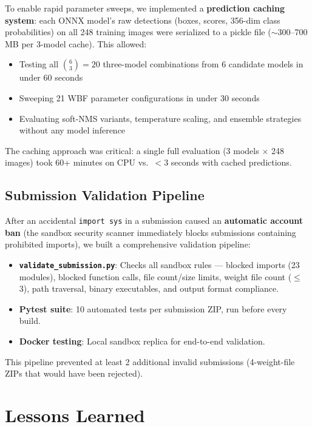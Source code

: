 \documentclass[11pt,a4paper]{article}
\begin{document}
To enable rapid parameter sweeps, we implemented a \textbf{prediction caching system}: each ONNX model's raw detections (boxes, scores, 356-dim class probabilities) on all 248 training images were serialized to a pickle file ($\sim$300--700\,MB per 3-model cache). This allowed:

\begin{itemize}
\item Testing all $\binom{6}{3} = 20$ three-model combinations from 6 candidate models in under 60 seconds
\item Sweeping 21 WBF parameter configurations in under 30 seconds
\item Evaluating soft-NMS variants, temperature scaling, and ensemble strategies without any model inference
\end{itemize}

The caching approach was critical: a single full evaluation (3 models $\times$ 248 images) took 60+ minutes on CPU vs.\ $<$3 seconds with cached predictions.

\subsection{Submission Validation Pipeline}

After an accidental \texttt{import sys} in a submission caused an \textbf{automatic account ban} (the sandbox security scanner immediately blocks submissions containing prohibited imports), we built a comprehensive validation pipeline:

\begin{itemize}
\item \textbf{\texttt{validate\_submission.py}}: Checks all sandbox rules --- blocked imports (23 modules), blocked function calls, file count/size limits, weight file count ($\leq$3), path traversal, binary executables, and output format compliance.
\item \textbf{Pytest suite}: 10 automated tests per submission ZIP, run before every build.
\item \textbf{Docker testing}: Local sandbox replica for end-to-end validation.
\end{itemize}

This pipeline prevented at least 2 additional invalid submissions (4-weight-file ZIPs that would have been rejected).

\section{Lessons Learned}
\label{sec:lessons}
\end{document}
